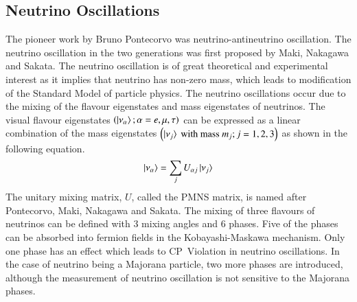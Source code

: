 \subsection{Neutrino Oscillations}
The pioneer work by Bruno Pontecorvo was neutrino-antineutrino
oscillation\cite{pontecorvo1,pontecorvo2}.
The neutrino oscillation in the two generations was first proposed
by Maki, Nakagawa and Sakata\cite{neutosc1962}.
The neutrino oscillation is of great theoretical and experimental
interest as it implies that neutrino has non-zero mass, which leads to
modification of the Standard Model of particle physics. The neutrino
oscillations occur due to the mixing of the flavour eigenstates and
mass eigenstates of neutrinos. The visual flavour eigenstates
$\left(\ket{\nu_{\alpha}};\alpha=e,\mu,\tau\right)$ can be expressed as
a linear combination of the mass eigenstates
$\left(\ket{\nu_{j}}\text{ with mass }m_{j};j=1,2,3\right)$ as shown in the following equation.
\begin{equation}
  \ket{\nu_{\alpha}}=\sum_{j}U_{\alpha j}\ket{\nu_{j}} \label{eq:tzero}
\end{equation}
The unitary mixing matrix, $U$, called the PMNS matrix, is named after
Pontecorvo, Maki, Nakagawa and Sakata. The mixing of three flavours of
neutrinos can be defined with 3 mixing angles and 6 phases. Five of
the phases can be absorbed into fermion fields in the Kobayashi-Maskawa
mechanism\cite{kobayashimaskawa}. Only one phase has an effect which
leads to CP~Violation in neutrino oscillations.
In the case of neutrino being a Majorana particle, two more phases
are introduced, although the measurement of neutrino oscillation is
not sensitive to the Majorana phases.

